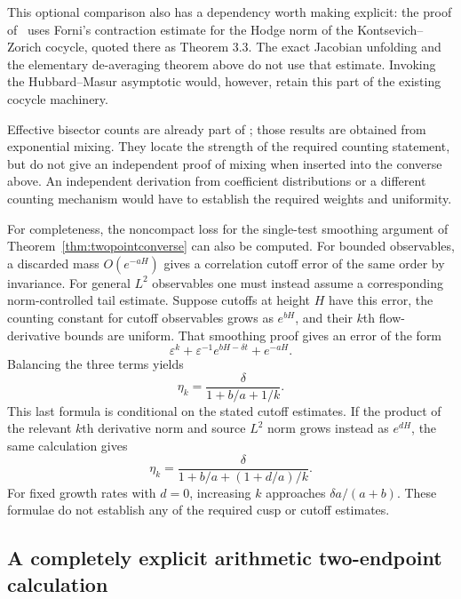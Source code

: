 \documentclass[11pt,a4paper]{article}
\numberwithin{equation}{section}
\theoremstyle{definition}
\theoremstyle{remark}
\begin{document}
This optional comparison also has a dependency worth making
explicit: the proof of~\cite[Proposition 2.5 and Section 3.2]{ABEMPolar}
uses Forni's contraction estimate for the Hodge norm of the
Kontsevich--Zorich cocycle, quoted there as Theorem 3.3. The exact
Jacobian unfolding and the elementary de-averaging theorem above
do not use that estimate. Invoking the Hubbard--Masur asymptotic
would, however, retain this part of the existing cocycle machinery.

Effective bisector counts are already part of
\cite[Section 10]{AranaHerreraLattice}; those results are obtained
from exponential mixing. They locate the strength of the required
counting statement, but do not give an independent proof of mixing
when inserted into the converse above. An independent derivation
from coefficient distributions or a different counting mechanism
would have to establish the required weights and uniformity.

For completeness, the noncompact loss for the single-test smoothing
argument of Theorem~\ref{thm:twopointconverse} can also be computed. For bounded
observables, a discarded mass $O(e^{-aH})$ gives a correlation cutoff
error of the same order by invariance. For general $L^2$ observables
one must instead assume a corresponding norm-controlled tail estimate.
Suppose cutoffs at height $H$ have this error, the counting
constant for cutoff observables grows as $e^{bH}$, and their $k$th
flow-derivative bounds are uniform. That smoothing proof gives an
error of the form
\[
 \varepsilon^k+
      \varepsilon^{-1}e^{bH-\delta t}+e^{-aH}.
\]
Balancing the three terms yields
\begin{equation}
 \eta_k=\frac{\delta}{1+b/a+1/k}.
 \label{eq:twopointcusprate}
\end{equation}
This last formula is conditional on the stated cutoff estimates.
If the product of the relevant $k$th derivative norm and source
$L^2$ norm grows instead as $e^{dH}$, the same calculation gives
\[
 \eta_k=\frac{\delta}{1+b/a+(1+d/a)/k}.
\]
For fixed growth rates with $d=0$, increasing $k$ approaches
$\delta a/(a+b)$. These formulae do not establish any of the
required cusp or cutoff estimates.


\subsection{A completely explicit arithmetic two-endpoint calculation}
\end{document}
